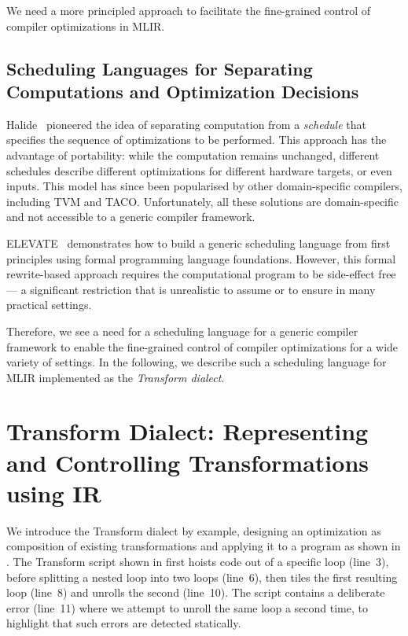 \documentclass[screen,nonacm,authorversion]{acmart}
\begin{document}
We need a more principled approach to facilitate the fine-grained control of compiler optimizations in MLIR.

\subsection{Scheduling Languages for Separating Computations and Optimization Decisions}

Halide~\cite{halide} pioneered the idea of separating computation from a \emph{schedule} that specifies the sequence of optimizations to be performed.
This approach has the advantage of portability: while the computation remains unchanged, different schedules describe different optimizations for different hardware targets, or even inputs.
This model has since been popularised by other domain-specific compilers, including TVM and TACO.
Unfortunately, all these solutions are domain-specific and not accessible to a generic compiler framework.

ELEVATE~\cite{rise} demonstrates how to build a generic scheduling language from first principles using formal programming language foundations.
However, this formal rewrite-based approach requires the computational program to be side-effect free --- a significant restriction that is unrealistic to assume or to ensure in many practical settings.

\smallskip
Therefore, we see a need for a scheduling language for a generic compiler framework to enable the fine-grained control of compiler optimizations for a wide variety of settings.
In the following, we describe such a scheduling language for MLIR implemented as the \emph{Transform dialect}.













\section{Transform Dialect: Representing and Controlling Transformations using IR}
\label{sec:transform_dialect}

We introduce the Transform dialect by example, designing an optimization as composition of existing transformations and applying it to a program as shown in .
The Transform script shown in  first hoists code out of a specific loop (line~3), before splitting a nested loop into two loops (line~6), then tiles the first resulting loop (line~8) and unrolls the second (line~10).
The script contains a deliberate error (line~11) where we attempt to unroll the same loop a second time, to highlight that such errors are detected statically.
\end{document}
